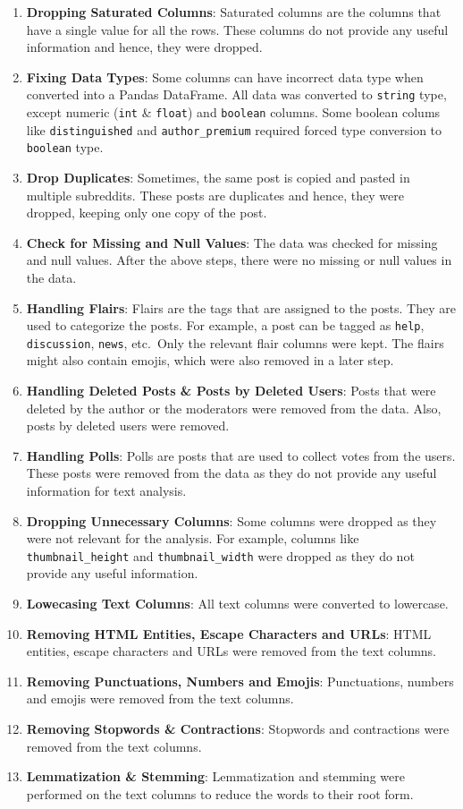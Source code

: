 \documentclass[12pt, letterpage]{article}
\begin{document}
\begin{enumerate}
    \item \textbf{Dropping Saturated Columns}: Saturated columns are the columns that have a single value for all the rows. These columns do not provide any useful information and hence, they were dropped.
    \item \textbf{Fixing Data Types}: Some columns can have incorrect data type when converted into a Pandas DataFrame. All data was converted to \texttt{string} type, except numeric (\texttt{int} \& \texttt{float}) and \texttt{boolean} columns. Some boolean colums like \texttt{distinguished} and \texttt{author\_premium}  required forced type conversion to \texttt{boolean} type.
    \item \textbf{Drop Duplicates}: Sometimes, the same post is copied and pasted in multiple subreddits. These posts are duplicates and hence, they were dropped, keeping only one copy of the post.
    \item \textbf{Check for Missing and Null Values}: The data was checked for missing and null values. After the above steps, there were no missing or null values in the data.
    \item \textbf{Handling Flairs}: Flairs are the tags that are assigned to the posts. They are used to categorize the posts. For example, a post can be tagged as \texttt{help}, \texttt{discussion}, \texttt{news}, etc.\ Only the relevant flair columns were kept. The flairs might also contain emojis, which were also removed in a later step.
    \item \textbf{Handling Deleted Posts \& Posts by Deleted Users}: Posts that were deleted by the author or the moderators were removed from the data. Also, posts by deleted users were removed.
    \item \textbf{Handling Polls}: Polls are posts that are used to collect votes from the users. These posts were removed from the data as they do not provide any useful information for text analysis.
    \item \textbf{Dropping Unnecessary Columns}: Some columns were dropped as they were not relevant for the analysis. For example, columns like \texttt{thumbnail\_height} and \texttt{thumbnail\_width} were dropped as they do not provide any useful information.
    \item \textbf{Lowecasing Text Columns}: All text columns were converted to lowercase.
    \item \textbf{Removing HTML Entities, Escape Characters and URLs}: HTML entities, escape characters and URLs were removed from the text columns.
    \item \textbf{Removing Punctuations, Numbers and Emojis}: Punctuations, numbers and emojis were removed from the text columns.
    \item \textbf{Removing Stopwords \& Contractions}: Stopwords and contractions were removed from the text columns.
    \item \textbf{Lemmatization \& Stemming}: Lemmatization and stemming were performed on the text columns to reduce the words to their root form.
\end{enumerate}
\end{document}
